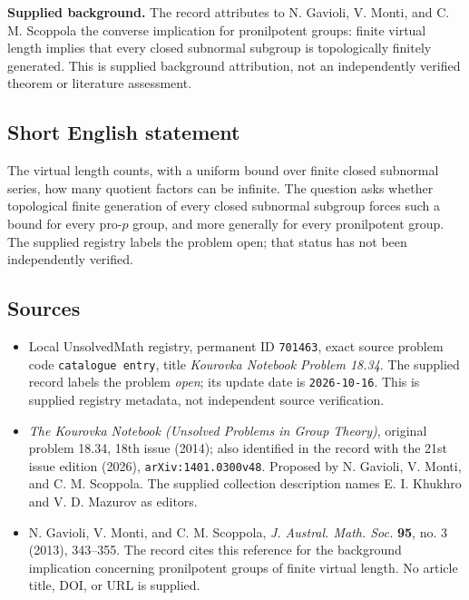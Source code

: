 \documentclass[11pt]{article}
\begin{document}
\textbf{Supplied background.} The record attributes to N. Gavioli, V. Monti, and C. M. Scoppola the converse implication for pronilpotent groups: finite virtual length implies that every closed subnormal subgroup is topologically finitely generated. This is supplied background attribution, not an independently verified theorem or literature assessment.
\subsection{Short English statement}
The virtual length counts, with a uniform bound over finite closed subnormal series, how many quotient factors can be infinite. The question asks whether topological finite generation of every closed subnormal subgroup forces such a bound for every pro-$p$ group, and more generally for every pronilpotent group. The supplied registry labels the problem open; that status has not been independently verified.
\subsection{Sources}
\begin{itemize}
\item Local UnsolvedMath registry, permanent ID \texttt{701463}, exact source problem code \texttt{catalogue entry}, title \emph{Kourovka Notebook Problem 18.34}. The supplied record labels the problem \emph{open}; its update date is \texttt{2026-10-16}. This is supplied registry metadata, not independent source verification.
\item \emph{The Kourovka Notebook (Unsolved Problems in Group Theory)}, original problem 18.34, 18th issue (2014); also identified in the record with the 21st issue edition (2026), \texttt{arXiv:1401.0300v48}. Proposed by N. Gavioli, V. Monti, and C. M. Scoppola. The supplied collection description names E. I. Khukhro and V. D. Mazurov as editors.
\item N. Gavioli, V. Monti, and C. M. Scoppola, \emph{J. Austral. Math. Soc.} \textbf{95}, no. 3 (2013), 343--355. The record cites this reference for the background implication concerning pronilpotent groups of finite virtual length. No article title, DOI, or URL is supplied.
\end{itemize}
\end{document}
